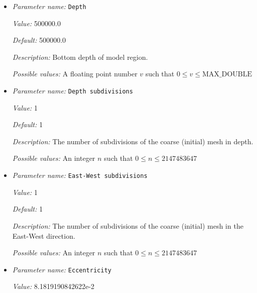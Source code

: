 \begin{itemize}
\item {\it Parameter name:} {\tt Depth}
\label{parameters:Geometry model/Ellipsoidal chunk/Depth}
\label{parameters:Geometry_20model/Ellipsoidal_20chunk/Depth}


{\it Value:} 500000.0


{\it Default:} 500000.0


{\it Description:} Bottom depth of model region.


{\it Possible values:} A floating point number $v$ such that $0 \leq v \leq \text{MAX\_DOUBLE}$
\item {\it Parameter name:} {\tt Depth subdivisions}
\label{parameters:Geometry model/Ellipsoidal chunk/Depth subdivisions}
\label{parameters:Geometry_20model/Ellipsoidal_20chunk/Depth_20subdivisions}


{\it Value:} 1


{\it Default:} 1


{\it Description:} The number of subdivisions of the coarse (initial) mesh in depth.


{\it Possible values:} An integer $n$ such that $0\leq n \leq 2147483647$
\item {\it Parameter name:} {\tt East-West subdivisions}
\label{parameters:Geometry model/Ellipsoidal chunk/East_2dWest subdivisions}
\label{parameters:Geometry_20model/Ellipsoidal_20chunk/East_2dWest_20subdivisions}


{\it Value:} 1


{\it Default:} 1


{\it Description:} The number of subdivisions of the coarse (initial) mesh in the East-West direction.


{\it Possible values:} An integer $n$ such that $0\leq n \leq 2147483647$
\item {\it Parameter name:} {\tt Eccentricity}
\label{parameters:Geometry model/Ellipsoidal chunk/Eccentricity}
\label{parameters:Geometry_20model/Ellipsoidal_20chunk/Eccentricity}


{\it Value:} 8.1819190842622e-2



\end{itemize}
